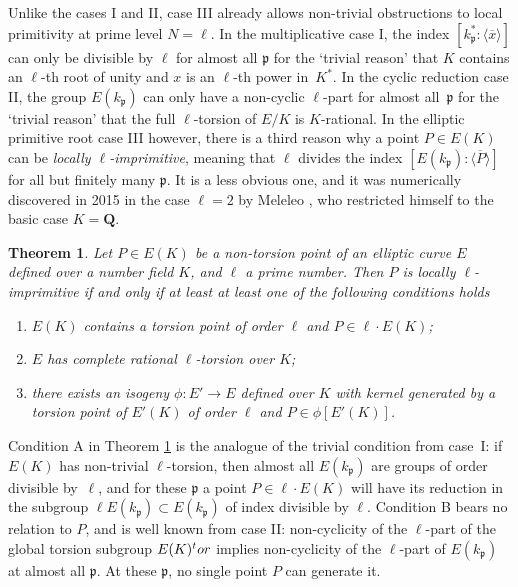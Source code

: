 \documentclass{amsart}
\theoremstyle{plain}
\newtheorem{theorem}{Theorem}[section]
\theoremstyle{definition}
\newcommand{\Que}{{\mathbf{Q}}}
\newcommand{\gothp}{{\mathfrak{p}}}
\newcommand{\tor}{\textup{tor}}
\begin{document}
Unlike the cases I and II,
case III already allows non-trivial obstructions to local primitivity at prime level $N=\ell$.
In the multiplicative case I, the index $[k_\gothp^*:\langle\overline x\rangle]$ can only
be divisible by $\ell$ for almost all $\gothp$ for the `trivial reason' that
$K$ contains an $\ell$-th root of unity and $x$ is an $\ell$-th power in~$K^*$.
In the cyclic reduction case II, the group $E(k_\gothp)$ can only have a non-cyclic $\ell$-part 
for almost all~$\gothp$ for the `trivial reason' that the full $\ell$-torsion
of $E/K$ is $K$-rational.
In the elliptic primitive root case III however, there is a third reason why 
a point $P\in E(K)$ can be \emph{locally $\ell$-imprimitive}, 
meaning that $\ell$ divides the index
$[E(k_\gothp):\langle \overline P\rangle]$ for all but finitely many $\gothp$.
It is a less obvious one, and it was numerically discovered in 2015 in the case $\ell=2$ 
by Meleleo \cite{Meleleo}, who restricted himself to the basic case $K=\Que$.
\begin{theorem}
\label{thm:lneverprim}
Let $P\in E(K)$ be a non-torsion point of an elliptic curve $E$ defined over a number field $K$, 
and $\ell$ a prime number.
Then $P$ is locally $\ell$-imprimitive
if and only if at least at least one of the following conditions holds
\begin{enumerate}
\item[A.]
$E(K)$ contains a torsion point of order $\ell$ and  $P\in \ell\cdot E(K)$;
\item[B.]
$E$ has complete rational $\ell$-torsion over $K$;
\item[C.]
there exists an isogeny $\phi: E'\to E$ defined over $K$ with
kernel generated by a torsion point of $E'(K)$ of order $\ell$ and $P\in\phi[E'(K)]$.
\end{enumerate}
\end{theorem}

\noindent
Condition A in Theorem \ref{thm:lneverprim} 
is the analogue of the trivial condition from case~I:
if $E(K)$ has non-trivial $\ell$-torsion,
then almost all $E(k_\gothp)$ are groups of order divisible 
by~$\ell$, and for these $\gothp$
a point $P\in \ell\cdot E(K)$ will have its reduction in the subgroup 
$\ell E(k_\gothp) \subset E(k_\gothp)$ of index divisible by $\ell$.
Condition B bears no relation to $P$, and is well known
from case II:
non-cyclicity of the $\ell$-part of 
the global torsion subgroup $E(K)^\tor$
implies non-cyclicity of the $\ell$-part of $E(k_\gothp)$
at almost all $\gothp$.
At these $\gothp$, no single point $P$ can generate it.
\end{document}
